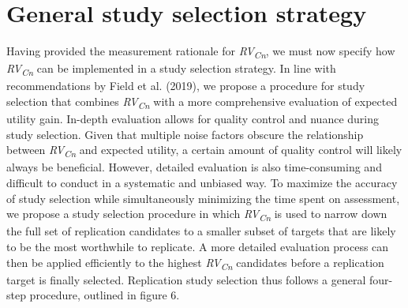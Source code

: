 \documentclass[
  english,
  jou,floatsintext]{apa6}
\begin{document}
\hypertarget{general-study-selection-strategy}{%
\section{General study selection strategy}\label{general-study-selection-strategy}}

Having provided the measurement rationale for \emph{RV\textsubscript{Cn}}, we must now specify how \emph{RV\textsubscript{Cn}} can be implemented in a study selection strategy. In line with recommendations by Field et al. (2019), we propose a procedure for study selection that combines \emph{RV\textsubscript{Cn}} with a more comprehensive evaluation of expected utility gain. In-depth evaluation allows for quality control and nuance during study selection. Given that multiple noise factors obscure the relationship between \emph{RV\textsubscript{Cn}} and expected utility, a certain amount of quality control will likely always be beneficial. However, detailed evaluation is also time-consuming and difficult to conduct in a systematic and unbiased way. To maximize the accuracy of study selection while simultaneously minimizing the time spent on assessment, we propose a study selection procedure in which \emph{RV\textsubscript{Cn}} is used to narrow down the full set of replication candidates to a smaller subset of targets that are likely to be the most worthwhile to replicate. A more detailed evaluation process can then be applied efficiently to the highest \emph{RV\textsubscript{Cn}} candidates before a replication target is finally selected. Replication study selection thus follows a general four-step procedure, outlined in figure 6.
\end{document}
